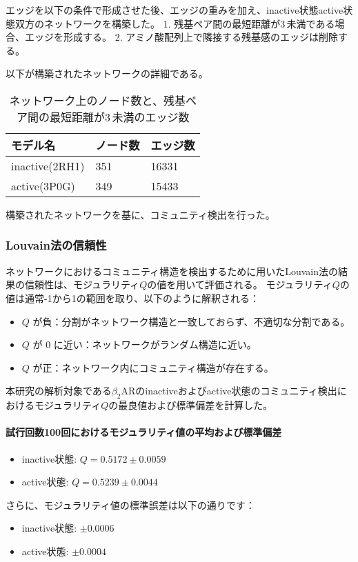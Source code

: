 エッジを以下の条件で形成させた後、エッジの重みを加え、inactive状態active状態双方のネットワークを構築した。
1. 残基ペア間の最短距離が3\,\text{\AA}未満である場合、エッジを形成する。
2. アミノ酸配列上で隣接する残基感のエッジは削除する。

以下が構築されたネットワークの詳細である。
\begin{table}[!ht]
    \centering
    \caption{ネットワーク上のノード数と、残基ペア間の最短距離が3\,\text{\AA}未満のエッジ数}
    \begin{tabular}{lll}
      \hline
      モデル名          & ノード数  & エッジ数 \\
      \hline 
      inactive(2RH1)  &  351 &  16331 \\ 
      active(3P0G)    &  349 &  15433 \\ 
    \end{tabular}
    \label{tab:network_size}
  \end{table}

構築されたネットワークを基に、コミュニティ検出を行った。
\subsubsection{Louvain法の信頼性}

ネットワークにおけるコミュニティ構造を検出するために用いたLouvain法の結果の信頼性は、モジュラリティ$Q$の値を用いて評価される。
モジュラリティ$Q$の値は通常-1から1の範囲を取り、以下のように解釈される：

\begin{itemize}
    \item \( Q \) が負：分割がネットワーク構造と一致しておらず、不適切な分割である。
    \item \( Q \) が 0 に近い：ネットワークがランダム構造に近い。
    \item \( Q \) が正：ネットワーク内にコミュニティ構造が存在する。
\end{itemize}

本研究の解析対象である$\beta_2$ARのinactiveおよびactive状態のコミュニティ検出におけるモジュラリティ$Q$の最良値および標準偏差を計算した。

\paragraph{試行回数100回におけるモジュラリティ値の平均および標準偏差}
\begin{itemize}
    \item inactive状態: \( Q = 0.5172 \pm 0.0059 \)
    \item active状態: \( Q = 0.5239 \pm 0.0044 \)
\end{itemize}
さらに、モジュラリティ値の標準誤差は以下の通りです：
\begin{itemize}
    \item inactive状態: \( \pm 0.0006 \)
    \item active状態: \( \pm 0.0004 \)
\end{itemize}

